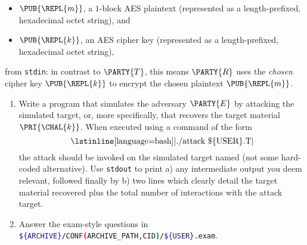 \begin{itemize}
\item $\PUB{\REPL{m}}$,
      a  ${1}$-block     AES  plaintext
      (represented as a  length-prefixed, hexadecimal octet   string),
      and            
\item $\PUB{\REPL{k}}$,
      an                 AES cipher key
      (represented as a  length-prefixed, hexadecimal octet   string),
\end{itemize}

\noindent
from \lstinline[language={bash}]{stdin}:
in contrast to $\PARTY{T}$, this means $\PARTY{R}$ uses the
{\em chosen} cipher key $\PUB{\REPL{k}}$ 
to encrypt the
     chosen  plaintext  $\PUB{\REPL{m}}$.



\begin{enumerate}
\item Write a program that simulates the adversary $\PARTY{E}$ by attacking
      the simulated target, or, more specifically, that recovers the target 
      material $\PRI{\CHAL{k}}$.  
      When executed using a command of the form
      \[
      \mbox{\lstinline[language={bash}]|./attack \$\{USER\}.T|}
      \]
      the attack should be invoked on the simulated target named (not some
      hard-coded alternative).  Use \lstinline[language={bash}]{stdout} to 
      print 
      a) any intermediate output you deem relevant, followed finally by 
      b) two lines which clearly detail the target material recovered plus
         the total number of interactions with the attack target.
\item Answer the exam-style questions in 
      \lstinline[language={bash}]|${ARCHIVE}/CONF(ARCHIVE_PATH,CID)/${USER}.exam|.
\end{enumerate}

